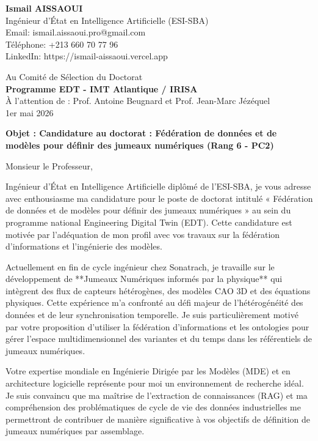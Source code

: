 \documentclass[11pt,a4paper]{article}
\begin{document}
\noindent \textbf{Ismail AISSAOUI} \\
Ingénieur d'État en Intelligence Artificielle (ESI-SBA) \\
Email: ismail.aissaoui.pro@gmail.com \\
Téléphone: +213 660 70 77 96 \\
LinkedIn: https://ismail-aissaoui.vercel.app

\bigskip

\begin{flushright}
    Au Comité de Sélection du Doctorat \\
    \textbf{Programme EDT - IMT Atlantique / IRISA} \\
    À l'attention de : Prof. Antoine Beugnard et Prof. Jean-Marc Jézéquel \\
    \medskip
    1er mai 2026
\end{flushright}

\bigskip

\noindent \textbf{Objet : Candidature au doctorat : Fédération de données et de modèles pour définir des jumeaux numériques (Rang 6 - PC2)}

\bigskip

Monsieur le Professeur,

Ingénieur d'État en Intelligence Artificielle diplômé de l'ESI-SBA, je vous adresse avec enthousiasme ma candidature pour le poste de doctorat intitulé « Fédération de données et de modèles pour définir des jumeaux numériques » au sein du programme national Engineering Digital Twin (EDT). Cette candidature est motivée par l'adéquation de mon profil avec vos travaux sur la fédération d'informations et l'ingénierie des modèles.

Actuellement en fin de cycle ingénieur chez Sonatrach, je travaille sur le développement de **Jumeaux Numériques informés par la physique** qui intègrent des flux de capteurs hétérogènes, des modèles CAO 3D et des équations physiques. Cette expérience m'a confronté au défi majeur de l'hétérogénéité des données et de leur synchronisation temporelle. Je suis particulièrement motivé par votre proposition d'utiliser la fédération d'informations et les ontologies pour gérer l'espace multidimensionnel des variantes et du temps dans les référentiels de jumeaux numériques.

Votre expertise mondiale en Ingénierie Dirigée par les Modèles (MDE) et en architecture logicielle représente pour moi un environnement de recherche idéal. Je suis convaincu que ma maîtrise de l'extraction de connaissances (RAG) et ma compréhension des problématiques de cycle de vie des données industrielles me permettront de contribuer de manière significative à vos objectifs de définition de jumeaux numériques par assemblage.
\end{document}
